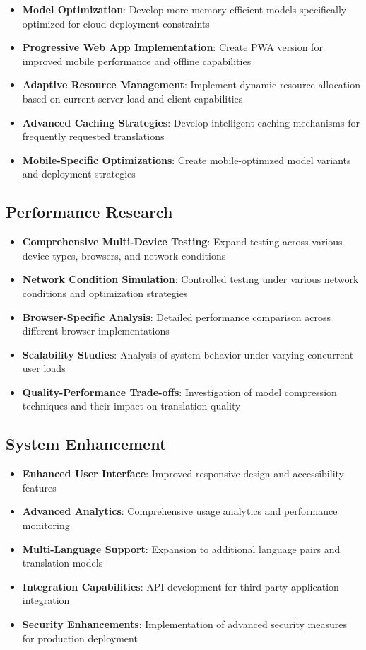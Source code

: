 \documentclass[conference]{IEEEtran}
\begin{document}
\begin{itemize}
    \item \textbf{Model Optimization}: Develop more memory-efficient models specifically optimized for cloud deployment constraints
    \item \textbf{Progressive Web App Implementation}: Create PWA version for improved mobile performance and offline capabilities
    \item \textbf{Adaptive Resource Management}: Implement dynamic resource allocation based on current server load and client capabilities
    \item \textbf{Advanced Caching Strategies}: Develop intelligent caching mechanisms for frequently requested translations
    \item \textbf{Mobile-Specific Optimizations}: Create mobile-optimized model variants and deployment strategies
\end{itemize}

\subsection{Performance Research}

\begin{itemize}
    \item \textbf{Comprehensive Multi-Device Testing}: Expand testing across various device types, browsers, and network conditions
    \item \textbf{Network Condition Simulation}: Controlled testing under various network conditions and optimization strategies
    \item \textbf{Browser-Specific Analysis}: Detailed performance comparison across different browser implementations
    \item \textbf{Scalability Studies}: Analysis of system behavior under varying concurrent user loads
    \item \textbf{Quality-Performance Trade-offs}: Investigation of model compression techniques and their impact on translation quality
\end{itemize}

\subsection{System Enhancement}

\begin{itemize}
    \item \textbf{Enhanced User Interface}: Improved responsive design and accessibility features
    \item \textbf{Advanced Analytics}: Comprehensive usage analytics and performance monitoring
    \item \textbf{Multi-Language Support}: Expansion to additional language pairs and translation models
    \item \textbf{Integration Capabilities}: API development for third-party application integration
    \item \textbf{Security Enhancements}: Implementation of advanced security measures for production deployment
\end{itemize}
\end{document}
